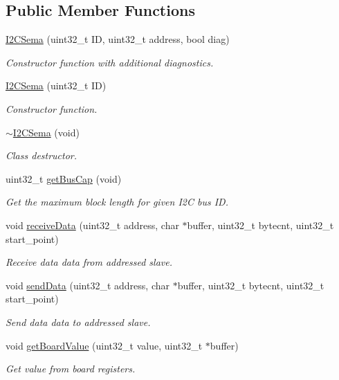 \subsection*{Public Member Functions}
\begin{DoxyCompactItemize}
\item 
\hyperlink{class_i2_c_sema_ad9b53f523e31c4a24a73463591473358}{I2\+C\+Sema} (uint32\+\_\+t ID, uint32\+\_\+t address, bool diag)
\begin{DoxyCompactList}\small\item\em Constructor function with additional diagnostics. \end{DoxyCompactList}\item 
\hyperlink{class_i2_c_sema_a627eb561a9ca1bb08f39a4f58cae0b3c}{I2\+C\+Sema} (uint32\+\_\+t ID)
\begin{DoxyCompactList}\small\item\em Constructor function. \end{DoxyCompactList}\item 
\hyperlink{class_i2_c_sema_ade6cfd73c317f5339a5b02558b5f5a11}{$\sim$\+I2\+C\+Sema} (void)
\begin{DoxyCompactList}\small\item\em Class destructor. \end{DoxyCompactList}\item 
uint32\+\_\+t \hyperlink{class_i2_c_sema_ad4d4a853db59af3579b29dbc1b739406}{get\+Bus\+Cap} (void)
\begin{DoxyCompactList}\small\item\em Get the maximum block length for given I2C bus ID. \end{DoxyCompactList}\item 
void \hyperlink{class_i2_c_sema_a6a30231be086ddee8255b8c9863a75fe}{receive\+Data} (uint32\+\_\+t address, char $\ast$buffer, uint32\+\_\+t bytecnt, uint32\+\_\+t start\+\_\+point)
\begin{DoxyCompactList}\small\item\em Receive data data from addressed slave. \end{DoxyCompactList}\item 
void \hyperlink{class_i2_c_sema_a291907b6f7eca62b0d3957a19f86c239}{send\+Data} (uint32\+\_\+t address, char $\ast$buffer, uint32\+\_\+t bytecnt, uint32\+\_\+t start\+\_\+point)
\begin{DoxyCompactList}\small\item\em Send data data to addressed slave. \end{DoxyCompactList}\item 
void \hyperlink{class_i2_c_sema_ac03b06a86f07af407a1dbdc26a9b04c7}{get\+Board\+Value} (uint32\+\_\+t value, uint32\+\_\+t $\ast$buffer)
\begin{DoxyCompactList}\small\item\em Get value from board registers. \end{DoxyCompactList}\end{DoxyCompactItemize}
